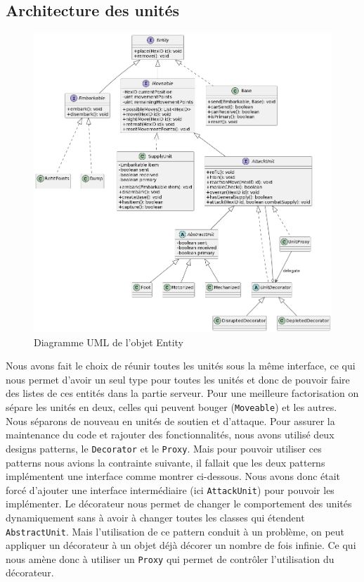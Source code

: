 \subsection{Architecture des unités}

\begin{figure}[H]
    \centering
    \includegraphics[scale=0.3]{data/uml_entityV4.png}
    \caption{Diagramme UML de l'objet Entity}
    \label{fig:uml_entity}
\end{figure}

Nous avons fait le choix de réunir toutes les unités sous la même interface, ce qui nous permet d'avoir un seul type pour toutes les unités et donc de pouvoir faire des listes de ces entités dans la partie serveur.
Pour une meilleure factorisation on sépare les unités en deux, celles qui peuvent bouger (\lstinline{Moveable}) et les autres. Nous séparons de nouveau en unités de soutien et d'attaque. Pour assurer la maintenance du code et rajouter des fonctionnalités, nous avons utilisé deux designs patterns, le \lstinline{Decorator} et le \lstinline{Proxy}. Mais pour pouvoir utiliser ces patterns nous avions la contrainte suivante, il fallait que les deux patterns implémentent une interface comme montrer ci-dessous. Nous avons donc était forcé d'ajouter une interface intermédiaire (ici \lstinline{AttackUnit}) pour pouvoir les implémenter. Le décorateur nous permet de changer le comportement des unités dynamiquement sans à avoir à changer toutes les classes qui étendent \lstinline{AbstractUnit}. Mais l'utilisation de ce pattern conduit à un problème, on peut appliquer un décorateur à un objet déjà décorer un nombre de fois infinie. Ce qui nous amène donc à utiliser un \lstinline{Proxy} qui permet de contrôler l'utilisation du décorateur.

